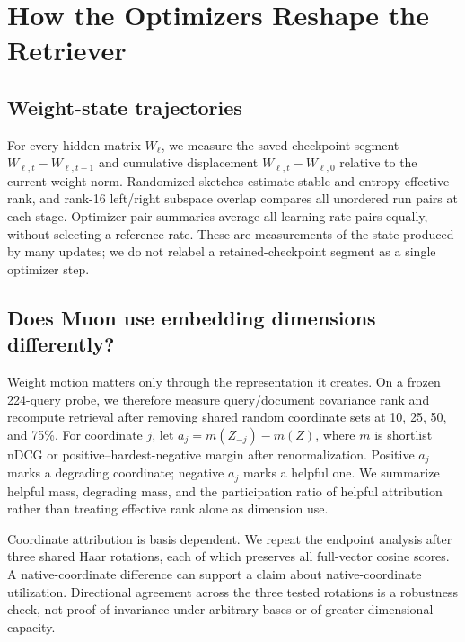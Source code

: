 \documentclass[11pt]{article}
\begin{document}
\CorrectedMainSection

\section{How the Optimizers Reshape the Retriever}

\subsection{Weight-state trajectories}

For every hidden matrix $W_\ell$, we measure the saved-checkpoint segment
$W_{\ell,t}-W_{\ell,t-1}$ and cumulative displacement $W_{\ell,t}-W_{\ell,0}$ relative to the
current weight norm. Randomized sketches estimate stable and entropy effective rank, and rank-16
left/right subspace overlap compares all unordered run pairs at each stage. Optimizer-pair summaries
average all learning-rate pairs equally, without selecting a reference rate. These
are measurements of the state produced by many updates; we do not relabel a retained-checkpoint
segment as a single optimizer step.

\CorrectedWeightSpaceFinding

\subsection{Does Muon use embedding dimensions differently?}

Weight motion matters only through the representation it creates. On a frozen 224-query probe, we
therefore measure query/document covariance rank and recompute retrieval after removing shared
random coordinate sets at 10, 25, 50, and 75\%. For coordinate $j$, let
$a_j=m(Z_{-j})-m(Z)$, where $m$ is shortlist nDCG or positive--hardest-negative margin after
renormalization. Positive $a_j$ marks a degrading coordinate; negative $a_j$ marks a helpful one.
We summarize helpful mass, degrading mass, and the participation ratio of helpful attribution rather
than treating effective rank alone as dimension use.

Coordinate attribution is basis dependent. We repeat the endpoint analysis after three shared Haar
rotations, each of which preserves all full-vector cosine scores. A native-coordinate difference can
support a claim about native-coordinate utilization. Directional agreement across the three tested
rotations is a robustness check, not proof of invariance under arbitrary bases or of greater
dimensional capacity.
\end{document}
